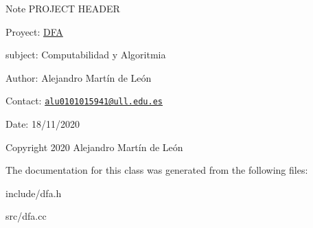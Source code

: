 \begin{DoxyNote}{Note}
P\+R\+O\+J\+E\+CT H\+E\+A\+D\+ER 

Proyect\+: \hyperlink{classDFA}{D\+FA} 

subject\+: Computabilidad y Algoritmia 

Author\+: Alejandro Martín de León 

Contact\+: \href{mailto:alu0101015941@ull.edu.es}{\tt alu0101015941@ull.\+edu.\+es} 

Date\+: 18/11/2020 

Copyright 2020 Alejandro Martín de León 
\end{DoxyNote}


The documentation for this class was generated from the following files\+:\begin{DoxyCompactItemize}
\item 
include/dfa.\+h\item 
src/dfa.\+cc\end{DoxyCompactItemize}
